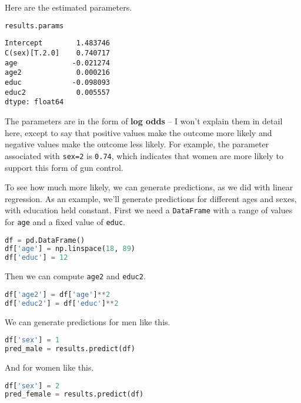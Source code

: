 \pagebreak

Here are the estimated parameters.

\begin{lstlisting}[language=Python,style=source]
results.params
\end{lstlisting}

\begin{lstlisting}[style=output]
Intercept        1.483746
C(sex)[T.2.0]    0.740717
age             -0.021274
age2             0.000216
educ            -0.098093
educ2            0.005557
dtype: float64
\end{lstlisting}

The parameters are in the form of \textbf{log odds} -- I won't explain
them in detail here, except to say that positive values make the outcome
more likely and negative values make the outcome less likely. For
example, the parameter associated with \passthrough{\lstinline!sex=2!}
is \passthrough{\lstinline!0.74!}, which indicates that women are more
likely to support this form of gun control.

To see how much more likely, we can generate predictions, as we did with
linear regression. As an example, we'll generate predictions for
different ages and sexes, with education held constant. First we need a
\passthrough{\lstinline!DataFrame!} with a range of values for
\passthrough{\lstinline!age!} and a fixed value of
\passthrough{\lstinline!educ!}.

\begin{lstlisting}[language=Python,style=source]
df = pd.DataFrame()
df['age'] = np.linspace(18, 89)
df['educ'] = 12
\end{lstlisting}

Then we can compute \passthrough{\lstinline!age2!} and
\passthrough{\lstinline!educ2!}.

\begin{lstlisting}[language=Python,style=source]
df['age2'] = df['age']**2
df['educ2'] = df['educ']**2
\end{lstlisting}

We can generate predictions for men like this.

\begin{lstlisting}[language=Python,style=source]
df['sex'] = 1
pred_male = results.predict(df)
\end{lstlisting}

And for women like this.

\begin{lstlisting}[language=Python,style=source]
df['sex'] = 2
pred_female = results.predict(df)
\end{lstlisting}

